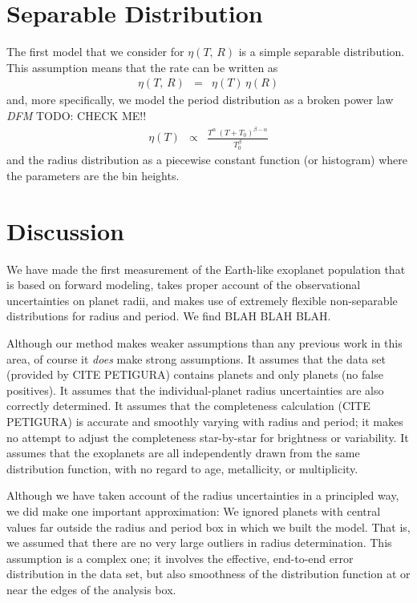 \documentclass[12pt,preprint]{aastex}
\newcommand{\todo}[3]{{\color{#2} \emph{#1} TODO: #3}}
\newcommand{\dfmtodo}[1]{\todo{DFM}{red}{#1}}
\newcommand{\rate}{\ensuremath{\eta}}
\newcommand{\radius}{\ensuremath{R}}
\newcommand{\period}{\ensuremath{T}}
\begin{document}
\section{Separable Distribution}

The first model that we consider for $\rate(\period,\,\radius)$ is a simple
separable distribution.
This assumption means that the rate can be written as
\begin{eqnarray}
\rate(\period,\,\radius) &=& \rate(\period)\,\rate(\radius)
\end{eqnarray}
and, more specifically, we model the period distribution as a broken power law
\dfmtodo{CHECK ME!!}
\begin{eqnarray}
\rate(\period) &\propto& \frac{\period^\alpha \,
(\period+\period_0)^{\beta-\alpha}}{\period_0^\beta}
\end{eqnarray}
and the radius distribution as a piecewise constant function (or histogram)
where the parameters are the bin heights.

\section{Discussion}

We have made the first measurement of the Earth-like exoplanet population that
is based on forward modeling, takes proper account of the observational
uncertainties on planet radii, and makes use of extremely flexible
non-separable distributions for radius and period.
We find BLAH BLAH BLAH.

Although our method makes weaker assumptions than any previous work in this
area, of course it \emph{does} make strong assumptions.
It assumes that the data set (provided by CITE PETIGURA) contains planets and
only planets (no false positives).
It assumes that the individual-planet radius uncertainties are also correctly
determined.
It assumes that the completeness calculation (CITE PETIGURA) is accurate and
smoothly varying with radius and period; it makes no attempt to adjust the
completeness star-by-star for brightness or variability.
It assumes that the exoplanets are all independently drawn from the same
distribution function, with no regard to age, metallicity, or multiplicity.

Although we have taken account of the radius uncertainties in a principled
way, we did make one important approximation: We ignored planets with central
values far outside the radius and period box in which we built the model.
That is, we assumed that there are no very large outliers in radius
determination.
This assumption is a complex one; it involves the effective, end-to-end error
distribution in the data set, but also smoothness of the distribution function
at or near the edges of the analysis box.
\end{document}
